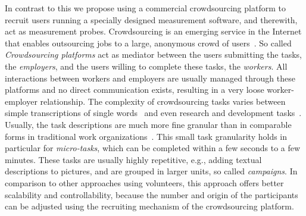 In contrast to this we propose using a commercial crowdsourcing platform to recruit users running a specially designed measurement software, and therewith, act as measurement probes.
Crowdsourcing is an emerging service in the Internet that enables outsourcing jobs to a large, anonymous crowd of users~\cite{articles2013-113}.
So called \emph{Crowdsourcing platforms} act as mediator between the users submitting the tasks, the \emph{employers}, and the users willing to complete these tasks, the \emph{workers}.
All interactions between workers and employers are usually managed through these platforms and no direct communication exists, resulting in a very loose worker-employer relationship.
The complexity of crowdsourcing tasks varies between simple transcriptions of single words~\cite{vonAhn2008} and even research and development tasks~\cite{innocentive}.
Usually, the task descriptions are much more fine granular than in comparable forms in traditional work organizations~\cite{conf2011-417}.
This small task granularity holds in particular for \emph{micro-tasks}, which can be completed within a few seconds to a few minutes.
These tasks are usually highly repetitive, e.g., adding textual descriptions to pictures, and are grouped in larger units, so called \emph{campaigns}.
In comparison to other approaches using volunteers, this approach offers better scalability and controllability, because the number and origin of the participants can be adjusted using the recruiting mechanism of the crowdsourcing platform.
